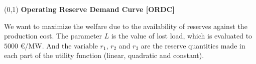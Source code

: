 \begin{center}
\boxput*(0,1){\colorbox{white}{\textbf{ Operating Reserve Demand Curve [ORDC] }}}{
\setlength{\fboxsep}{10pt}
}
\end{center}

We want to maximize the welfare due to the availability of reserves against the production cost. The parameter $L$ is the value of lost load, which is evaluated to $5000$ \euro /MW. And the variable $r_1$, $r_2$ and $r_3$ are the reserve quantities made in each part of the utility function (linear, quadratic and constant).